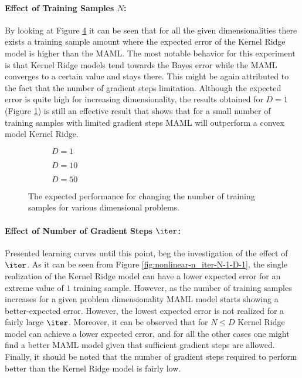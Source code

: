 \paragraph{Effect of Training Samples $N$:} By looking at Figure \ref{ref:nonlinear-N} it can be seen that for all the given dimensionalities there exists a training sample amount where the expected error of the Kernel Ridge model is higher than the MAML. The most notable behavior for this experiment is that Kernel Ridge models tend towards the Bayes error while the MAML converges to a certain value and stays there. This might be again attributed to the fact that the number of gradient steps limitation. Although the expected error is quite high for increasing dimensionality, the results obtained for $D=1$ (Figure \ref{fig:nonlinear-N-D-1}) is still an effective result that shows that for a small number of training samples with limited gradient steps MAML will outperform a convex model Kernel Ridge.

\begin{figure}[!h]
  \centering
    \begin{subfigure}{0.3\textwidth}
      \centering
      \caption{$D=1$}
      \label{fig:nonlinear-N-D-1}
    \end{subfigure}
    \begin{subfigure}{0.3\textwidth}
      \centering
      \caption{$D=10$}
      \label{fig:nonlinear-N-D-10}
    \end{subfigure}
    \begin{subfigure}{0.3\textwidth}
      \centering
      \caption{$D=50$}
      \label{fig:nonlinear-N-D-50}
    \end{subfigure}
  \caption{The expected performance for changing the number of training samples for various dimensional problems.}\label{ref:nonlinear-N}
\end{figure}


\paragraph{Effect of Number of Gradient Steps $\iter$:} Presented learning curves until this point, beg the investigation of the effect of $\iter$.  As it can be seen from Figure \ref{fig:nonlinear-n_iter-N-1-D-1}, the single realization of the Kernel Ridge model can have a lower expected error for an extreme value of $1$ training sample. However, as the number of training samples increases for a given problem dimensionality MAML model starts showing a better-expected error. However, the lowest expected error is not realized for a fairly large $\iter$. Moreover, it can be observed that for $N\leq D$ Kernel Ridge model can achieve a lower expected error, and for all the other cases one might find a better MAML model given that sufficient gradient steps are allowed. Finally, it should be noted that the number of gradient steps required to perform better than the Kernel Ridge model is fairly low.

